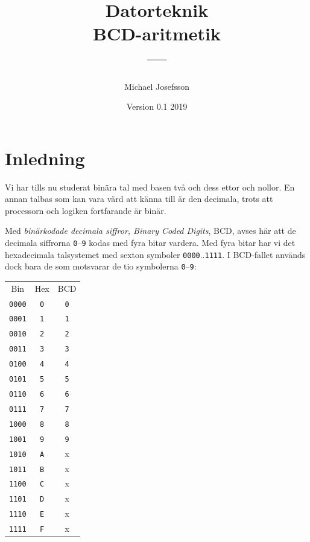 \documentclass[oneside,10pt,a4paper,swedish]{scrbook}
\newcommand{\asm}[1]{\texttt{#1}}
\begin{document}
\title{Datorteknik\\{}BCD-aritmetik\\{}---}

\author{Michael Josefsson}
\date{Version 0.1 2019}

\maketitle
\tableofcontents
\setcounter{chapter}{0}

\chapter{Inledning} Vi har tills nu studerat binära tal med basen två och dess ettor och nollor. En annan talbas som kan vara värd att känna till är den decimala, trots att processorn och logiken fortfarande är binär. 

Med \emph{binärkodade decimala siffror, Binary Coded Digits}, BCD, avses här att de decimala siffrorna \asm{0}--\asm{9} kodas med fyra bitar vardera. Med fyra bitar har vi det hexadecimala talsystemet med sexton symboler \asm{0000}..\asm{1111}. I BCD-fallet används dock bara de som motsvarar de tio symbolerna  \asm{0}--\asm{9}:

\begin{center}
\begin{tabular}{ccc}
Bin & Hex & BCD \\
\asm{0000} & \asm{0} & \asm{0}\\
\asm{0001} & \asm{1} & \asm{1}\\
\asm{0010} & \asm{2} & \asm{2}\\
\asm{0011} & \asm{3} & \asm{3}\\
\asm{0100} & \asm{4} & \asm{4}\\
\asm{0101} & \asm{5} & \asm{5}\\
\asm{0110} & \asm{6} & \asm{6}\\
\asm{0111} & \asm{7} & \asm{7}\\
\asm{1000} & \asm{8} & \asm{8}\\
\asm{1001} & \asm{9} & \asm{9}\\
\asm{1010} & \asm{A} & x\\
\asm{1011} & \asm{B} & x\\
\asm{1100} & \asm{C} & x\\
\asm{1101} & \asm{D} & x\\
\asm{1110} & \asm{E} & x\\
\asm{1111} & \asm{F} & x\\
\end{tabular}
\end{center}
\end{document}
